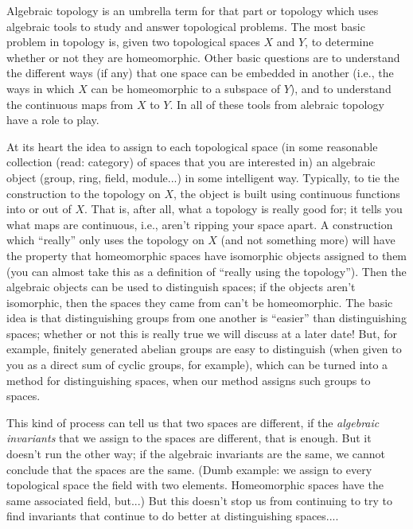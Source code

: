 \ssk

Algebraic topology is an umbrella term for that part or topology which uses
algebraic tools to study and answer topological problems. The most basic
problem in topology is, given two topological spaces $X$ and $Y$, to determine
whether or not they are homeomorphic. Other basic questions are to understand
the different ways (if any) that one space can be embedded in another
(i.e., the ways in which $X$ can be homeomorphic to a subspace of $Y$), and to 
understand the continuous maps from $X$ to $Y$. In all of these tools from 
alebraic topology have a role to play.

\ssk

At its heart the idea to assign to each topological space (in some reasonable
collection (read: category) of spaces that you are interested in) an algebraic
object (group, ring, field, module...) in some intelligent way. Typically, to tie 
the construction to the topology on $X$, the object is built using continuous
functions into or out of $X$. That is, after all, what a topology is really
good for; it tells you what maps are continuous, i.e., aren't ripping your
space apart. A construction which ``really'' only uses the topology on $X$ (and 
not something more) will have the property that homeomorphic spaces have
isomorphic objects assigned to them (you can almost take this as a definition
of ``really using the topology''). Then the algebraic objects can be used to
distinguish spaces; if the objects aren't isomorphic, then the spaces they came
from can't be homeomorphic. The basic idea is that distinguishing groups 
from one another is ``easier'' than distinguishing spaces; whether or not this 
is really true we will discuss at a later date! But, for example, finitely generated
abelian groups are easy to distinguish (when given to you as a direct sum of
cyclic groups, for example), which can be turned into a method for distinguishing
spaces, when our method assigns such groups to spaces.

\ssk

This kind of process can tell us that two spaces are different, if the {\it algebraic
invariants} that we assign to the spaces are different, that is enough. But it 
doesn't run the other way; if the algebraic invariants are the same, we cannot
conclude that the spaces are the same. (Dumb example: we assign to every topological
space the field with two elements. Homeomorphic spaces have the same associated 
field, but...) But this doesn't stop us from continuing to try to find invariants
that continue to do better at distinguishing spaces....

